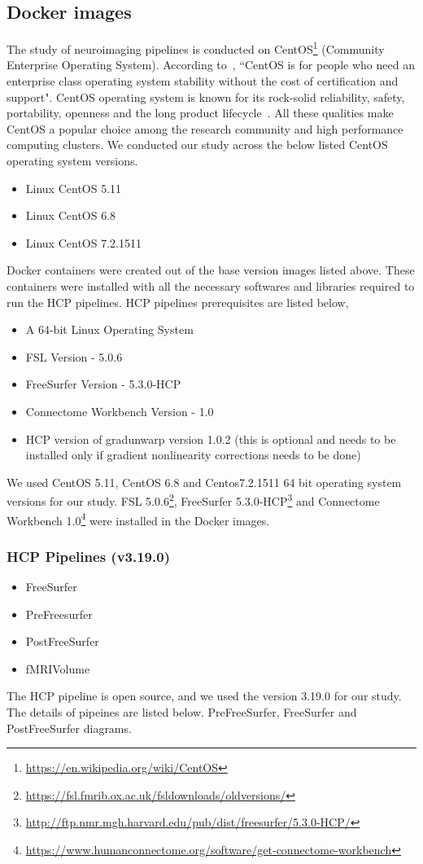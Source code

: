 \subsection{Docker images}
The study of neuroimaging pipelines is conducted on CentOS\footnote{\url{https://en.wikipedia.org/wiki/CentOS}} (Community Enterprise Operating System). According to~\cite{CentOS}, ``CentOS is for people who need an enterprise class operating system stability without the cost of certification and support". CentOS operating system is known for its rock-solid reliability, safety, portability, openness and the long product lifecycle~\cite{5665431}. All these qualities make CentOS a popular choice among the research community and
high performance computing clusters. We conducted our study across the below listed CentOS operating system versions.

\begin{itemize}
  \item Linux CentOS 5.11
  \item Linux CentOS 6.8
  \item Linux CentOS 7.2.1511
\end{itemize}

Docker containers were created out of the base version images listed above. These containers were installed with all the necessary softwares and libraries required to run the HCP pipelines. HCP pipelines prerequisites are listed below,
\begin{itemize}
 \item A 64-bit Linux Operating System
 \item FSL Version - 5.0.6
 \item FreeSurfer Version - 5.3.0-HCP
 \item Connectome Workbench Version - 1.0
 \item HCP version of gradunwarp version 1.0.2 (this is optional and needs to be installed only if gradient nonlinearity corrections needs to be done)
\end{itemize}

We used CentOS 5.11, CentOS 6.8 and Centos7.2.1511 64 bit operating system versions for our study. FSL 5.0.6\footnote{\url{https://fsl.fmrib.ox.ac.uk/fsldownloads/oldversions/}}, FreeSurfer 5.3.0-HCP\footnote{\url{http://ftp.nmr.mgh.harvard.edu/pub/dist/freesurfer/5.3.0-HCP/}} and Connectome Workbench 1.0\footnote{\url{https://www.humanconnectome.org/software/get-connectome-workbench}} were installed in the Docker images.

\subsubsection{HCP Pipelines (v3.19.0)}
\begin{itemize}
  \item FreeSurfer
  \item PreFreesurfer
  \item PostFreeSurfer
  \item fMRIVolume
\end{itemize}
The HCP pipeline is open source, and we used the version 3.19.0 for our study. The details of pipeines are listed below.
PreFreeSurfer, FreeSurfer and PostFreeSurfer diagrams.

